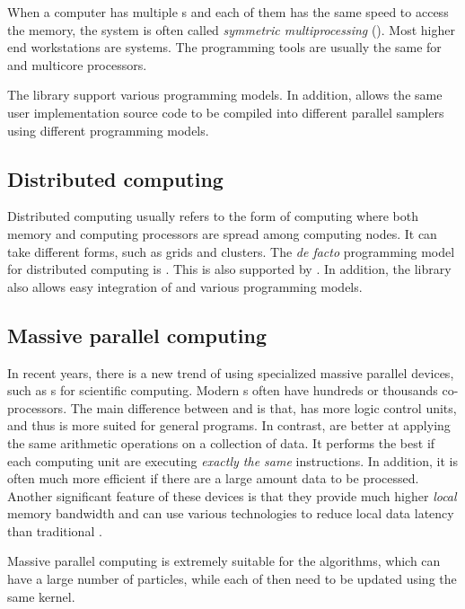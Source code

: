 When a computer has multiple \cpu{}s and each of them has the same speed to
access the memory, the system is often called \emph{symmetric multiprocessing}
(\smp). Most higher end workstations are \smp systems. The programming tools
are usually the same for \smp and multicore processors.

The \vsmc library support various \smp programming models. In addition, \vsmc
allows the same user implementation source code to be compiled into different
parallel samplers using different programming models.

\subsection{Distributed computing}
\label{sub:Distributed computing}

Distributed computing usually refers to the form of computing where both
memory and computing processors are spread among computing nodes. It can take
different forms, such as grids and clusters. The \emph{de facto} programming
model for distributed computing is \mpi. This is also supported by \vsmc. In
addition, the library also allows easy integration of \mpi and various \smp
programming models.

\subsection{Massive parallel computing}
\label{sub:Massive parallel computing}

In recent years, there is a new trend of using specialized massive parallel
devices, such as \gpu{}s for scientific computing. Modern \gpu{}s often have
hundreds or thousands co-processors. The main difference between \gpu and \cpu
is that, \cpu has more logic control units, and thus is more suited for
general programs. In contrast, \gpu are better at applying the same arithmetic
operations on a collection of data. It performs the best if each computing
unit are executing \emph{exactly the same} instructions. In addition, it is
often much more efficient if there are a large amount data to be processed.
Another significant feature of these devices is that they provide much higher
\emph{local} memory bandwidth and can use various technologies to reduce local
data latency than traditional \cpu.

Massive parallel computing is extremely suitable for the \smc algorithms,
which can have a large number of particles, while each of then need to be
updated using the same \mcmc kernel.

